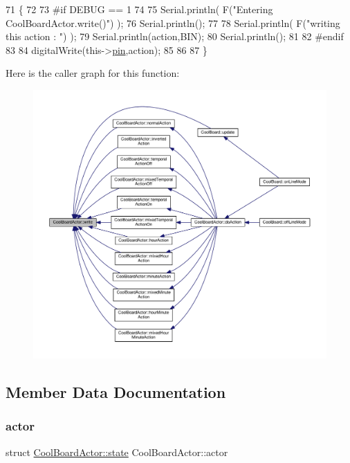 \begin{DoxyCode}
71 \{
72 
73 \textcolor{preprocessor}{#if DEBUG == 1}
74 
75     Serial.println( F(\textcolor{stringliteral}{"Entering CoolBoardActor.write()"}) );
76     Serial.println();
77 
78     Serial.println( F(\textcolor{stringliteral}{"writing this action : "}) );
79     Serial.println(action,BIN);
80     Serial.println();
81 
82 \textcolor{preprocessor}{#endif }
83     
84     digitalWrite(this->\hyperlink{class_cool_board_actor_a8b5c0b41fe6033b68d9e1ed00bc2e122}{pin},action);
85     
86 
87 \}
\end{DoxyCode}
Here is the caller graph for this function\+:\nopagebreak
\begin{figure}[H]
\begin{center}
\leavevmode
\includegraphics[width=350pt]{dc/d69/class_cool_board_actor_a958786ff01ea1056ee72c72d439f86da_icgraph}
\end{center}
\end{figure}


\subsection{Member Data Documentation}
\mbox{\label{class_cool_board_actor_a8f190db9f7a39fddbcef7f152da970e9}} 
\subsubsection{\texorpdfstring{actor}{actor}}
{\footnotesize\ttfamily struct \hyperlink{struct_cool_board_actor_1_1state}{Cool\+Board\+Actor\+::state} Cool\+Board\+Actor\+::actor\hspace{0.3cm}{\ttfamily [private]}}

